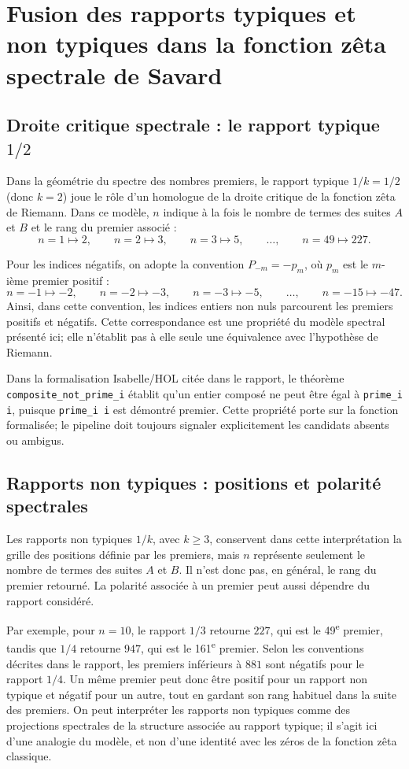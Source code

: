 \documentclass[11pt,a4paper]{article}
\begin{document}
\section{Fusion des rapports typiques et non typiques dans la fonction zêta spectrale de Savard}

\subsection{Droite critique spectrale : le rapport typique $1/2$}

Dans la géométrie du spectre des nombres premiers, le rapport typique
$1/k=1/2$ (donc $k=2$) joue le rôle d'un homologue de la droite critique
de la fonction zêta de Riemann. Dans ce modèle, $n$ indique à la fois le
nombre de termes des suites $A$ et $B$ et le rang du premier associé :
\[
n=1\mapsto 2,\qquad n=2\mapsto 3,\qquad n=3\mapsto 5,\qquad
\ldots,\qquad n=49\mapsto 227.
\]

Pour les indices négatifs, on adopte la convention $P_{-m}=-p_m$, où $p_m$
est le $m$-ième premier positif :
\[
n=-1\mapsto -2,\qquad n=-2\mapsto -3,\qquad n=-3\mapsto -5,\qquad
\ldots,\qquad n=-15\mapsto -47.
\]
Ainsi, dans cette convention, les indices entiers non nuls parcourent les
premiers positifs et négatifs. Cette correspondance est une propriété du
modèle spectral présenté ici; elle n'établit pas à elle seule une équivalence
avec l'hypothèse de Riemann.

Dans la formalisation Isabelle/HOL citée dans le rapport, le théorème
\texttt{composite\_not\_prime\_i} établit qu'un entier composé ne peut être
égal à \texttt{prime\_i i}, puisque \texttt{prime\_i i} est démontré premier.
Cette propriété porte sur la fonction formalisée; le pipeline doit toujours
signaler explicitement les candidats absents ou ambigus.

\subsection{Rapports non typiques : positions et polarité spectrales}

Les rapports non typiques $1/k$, avec $k\geq 3$, conservent dans cette
interprétation la grille des positions définie par les premiers, mais $n$
représente seulement le nombre de termes des suites $A$ et $B$. Il n'est donc
pas, en général, le rang du premier retourné. La polarité associée à un
premier peut aussi dépendre du rapport considéré.

Par exemple, pour $n=10$, le rapport $1/3$ retourne $227$, qui est le
49\textsuperscript{e} premier, tandis que $1/4$ retourne $947$, qui est le
161\textsuperscript{e} premier. Selon les conventions décrites dans le
rapport, les premiers inférieurs à $881$ sont négatifs pour le rapport $1/4$.
Un même premier peut donc être positif pour un rapport non typique et négatif
pour un autre, tout en gardant son rang habituel dans la suite des premiers.
On peut interpréter les rapports non typiques comme des projections spectrales
de la structure associée au rapport typique; il s'agit ici d'une analogie du
modèle, et non d'une identité avec les zéros de la fonction zêta classique.
\end{document}
